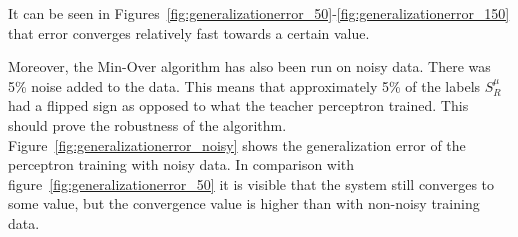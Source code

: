 It can be seen in Figures~\ref{fig:generalizationerror_50}-\ref{fig:generalizationerror_150} that error converges relatively fast towards a certain value.

Moreover, the Min-Over algorithm has also been run on noisy data. There was 5\% noise added to the data. This means that approximately 5\% of the labels $S^{\mu}_R$ had a flipped sign as opposed to what the teacher perceptron trained. This should prove the robustness of the algorithm.
Figure~\ref{fig:generalizationerror_noisy} shows the generalization error of the perceptron training with noisy data. In comparison with figure~\ref{fig:generalizationerror_50} it is visible that the system still converges to some value, but the convergence value is higher than with non-noisy training data. 

